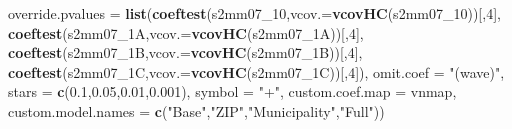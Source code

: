 \documentclass[
]{article}
\newenvironment{Shaded}{\begin{snugshade}}{\end{snugshade}}
\newcommand{\DataTypeTok}[1]{\textcolor[rgb]{0.13,0.29,0.53}{#1}}
\newcommand{\DecValTok}[1]{\textcolor[rgb]{0.00,0.00,0.81}{#1}}
\newcommand{\FloatTok}[1]{\textcolor[rgb]{0.00,0.00,0.81}{#1}}
\newcommand{\KeywordTok}[1]{\textcolor[rgb]{0.13,0.29,0.53}{\textbf{#1}}}
\newcommand{\NormalTok}[1]{#1}
\newcommand{\StringTok}[1]{\textcolor[rgb]{0.31,0.60,0.02}{#1}}
\begin{document}
\begin{Shaded}
\begin{Highlighting}[]
          \DataTypeTok{override.pvalues =} \KeywordTok{list}\NormalTok{(}\KeywordTok{coeftest}\NormalTok{(s2mm07_}\DecValTok{10}\NormalTok{,}\DataTypeTok{vcov.=}\KeywordTok{vcovHC}\NormalTok{(s2mm07_}\DecValTok{10}\NormalTok{))[,}\DecValTok{4}\NormalTok{],}
                                  \KeywordTok{coeftest}\NormalTok{(s2mm07_1A,}\DataTypeTok{vcov.=}\KeywordTok{vcovHC}\NormalTok{(s2mm07_1A))[,}\DecValTok{4}\NormalTok{],}
                                  \KeywordTok{coeftest}\NormalTok{(s2mm07_1B,}\DataTypeTok{vcov.=}\KeywordTok{vcovHC}\NormalTok{(s2mm07_1B))[,}\DecValTok{4}\NormalTok{],}
                                  \KeywordTok{coeftest}\NormalTok{(s2mm07_1C,}\DataTypeTok{vcov.=}\KeywordTok{vcovHC}\NormalTok{(s2mm07_1C))[,}\DecValTok{4}\NormalTok{]),}
          \DataTypeTok{omit.coef =} \StringTok{"(wave)"}\NormalTok{, }\DataTypeTok{stars =} \KeywordTok{c}\NormalTok{(}\FloatTok{0.1}\NormalTok{,}\FloatTok{0.05}\NormalTok{,}\FloatTok{0.01}\NormalTok{,}\FloatTok{0.001}\NormalTok{), }\DataTypeTok{symbol =} \StringTok{"+"}\NormalTok{,}
          \DataTypeTok{custom.coef.map =}\NormalTok{ vnmap, }
          \DataTypeTok{custom.model.names =} \KeywordTok{c}\NormalTok{(}\StringTok{"Base"}\NormalTok{,}\StringTok{"ZIP"}\NormalTok{,}\StringTok{"Municipality"}\NormalTok{,}\StringTok{"Full"}\NormalTok{))}
\end{Highlighting}
\end{Shaded}
\end{document}
